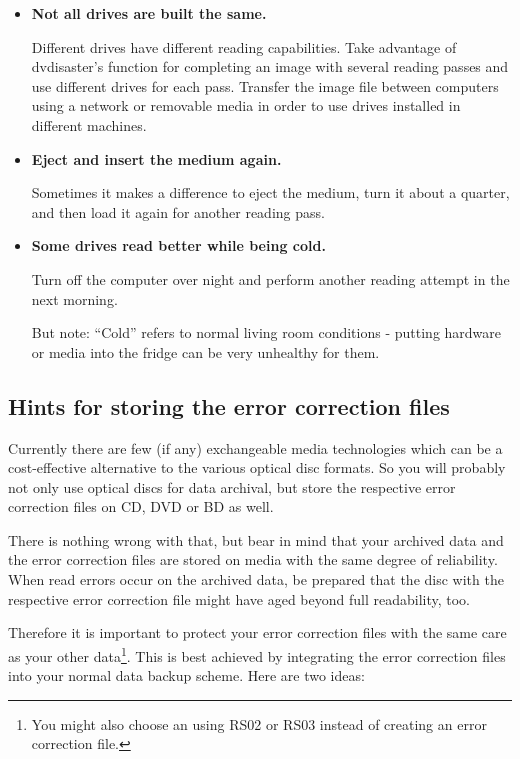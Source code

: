 \begin{itemize}
\item {\bf Not all drives are built the same.}
  
  Different drives have different reading capabilities. Take advantage of dvdisaster's
  function for completing an image with several reading passes and use different drives
  for each pass. Transfer the image file between computers using a network or removable
  media in order to use drives installed in different machines.

\item {\bf Eject and insert the medium again.}
  
  Sometimes it makes a difference to eject the medium, turn it about a quarter,
  and then load it again for another reading pass.

  \item {\bf Some drives read better while being cold.}

    Turn off the computer over night and perform another reading attempt in the next morning.

    But note: ``Cold'' refers to normal living room conditions - putting hardware or
    media into the fridge can be very unhealthy for them.
 \end{itemize}


\subsection{Hints for storing the error correction files}
\label{background-eccfile-storage}

Currently there are few (if any) exchangeable media technologies which can be a
cost-effective alternative to the various optical disc formats. So you will
probably not only use optical discs for data archival, but store the respective
error correction files on CD, DVD or BD as well.

\smallskip

There is nothing wrong with that, but bear in mind that your archived data and
the error correction files are stored on media with the same degree of reliability.
When read errors occur on the archived data, be prepared that the disc with the
respective error correction file might have aged beyond full readability, too.

\smallskip

Therefore it is important to protect your error correction files with the same
care as your other data\footnote{You might also choose
  an  using RS02 or RS03 instead
  of creating an error correction file.}.
This is best achieved by integrating the error correction files into
your normal data backup scheme. Here are two ideas:

